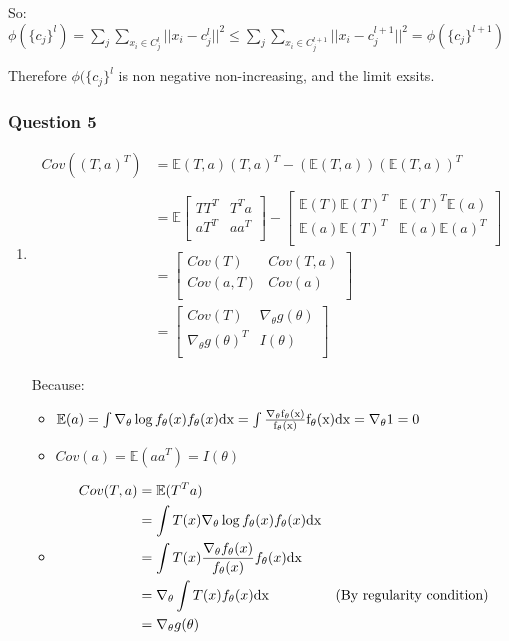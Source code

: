 \documentclass[12pt]{article}
\newcommand{\Q}[1]{\subsubsection*{Question #1}}
\newcommand{\Es}[1]{\mathbb{E}(#1)}
\begin{document}
So: $\phi(\{c_j\}^l) = \sum_j \sum_{x_i \in C_j^l} ||x_i - c_j^l||^2 \leq\sum_j \sum_{x_i \in C_j^{l+1}} ||x_i - c_j^{l+1}||^2 = \phi(\{c_j\}^{l+1})$

Therefore $\phi(\{c_j\}^l$ is non negative non-increasing, and the limit exsits.



\Q{5}

\begin{enumerate}
\item 

\begin{align*}
Cov( (T, a)^T ) &= \mathbb{E} (T, a) (T, a)^T -  (\mathbb{E} (T, a))(\mathbb{E} (T, a))^T\\
\\ &= \mathbb{E} 
\begin{bmatrix}TT^T & T^T a \\ aT^T & aa^T \\\end{bmatrix} 
- \begin{bmatrix}\Es T \Es T^T & \Es T^T \Es a \\ \Es a \Es T^T & \Es a \Es a^T \\\end{bmatrix} 
\\ &= 
\begin{bmatrix}Cov(T) & Cov(T,a) \\ Cov(a,T) & Cov(a) \\\end{bmatrix} 
\\ &= 
\begin{bmatrix}Cov(T) & \nabla_\theta g(\theta) \\ \nabla_\theta g(\theta)^T & I(\theta) \\\end{bmatrix} 
\end{align*}

Because:
\begin{itemize}
\item $\Es{a} = \int \nabla_\theta \log f_\theta(x) f_\theta(x) \rm{d}x 
= \int \frac{\nabla_\theta f_\theta(x)}{f_\theta(x)}f_\theta(x) \rm{d}x = \nabla_\theta 1 = 0$
\item $Cov(a) = \Es{aa^T} = I(\theta)$

\item
\begin{align*}
Cov(T, a) &= \Es{T^T a} \\
&= \int T(x) \nabla_\theta \log f_{\theta}(x)  f_{\theta}(x)\rm{d}x \\
&= \int T(x) \frac{\nabla_\theta f_{\theta}(x)}{ f_{\theta}(x)} f_{\theta}(x)\rm{d}x \\
&= \nabla_\theta \int T(x) f_{\theta}(x)\rm{d}x & \text{(By regularity condition)} \\
&= \nabla_\theta g(\theta)
\end{align*}
\end{itemize}


\end{enumerate}
\end{document}
